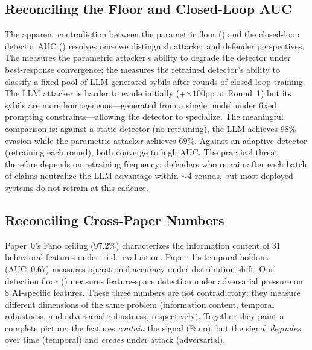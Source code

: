 \documentclass[sigconf,nonacm=false]{acmart}
\begin{document}
\subsection{Reconciling the \bestResponseAucFloorMean{} Floor and \closedLoopFinalAucMean{} Closed-Loop AUC}

The apparent contradiction between the parametric floor (\bestResponseAucFloorMean{}) and the closed-loop detector AUC (\closedLoopFinalAucMean{}) resolves once we distinguish attacker and defender perspectives. The \bestResponseAucFloorMean{} measures the parametric attacker's ability to degrade the detector under best-response convergence; the \closedLoopFinalAucMean{} measures the retrained detector's ability to classify a fixed pool of LLM-generated sybils after \bestResponseNRounds{} rounds of closed-loop training. The LLM attacker is harder to evade initially ($+$\closedLoopRoundEvasionDelta{}$\times 100$pp at Round~1) but its sybils are more homogeneous---generated from a single model under fixed prompting constraints---allowing the detector to specialize. The meaningful comparison is: against a static detector (no retraining), the LLM achieves 98\% evasion while the parametric attacker achieves 69\%. Against an adaptive detector (retraining each round), both converge to high AUC. The practical threat therefore depends on retraining frequency: defenders who retrain after each batch of claims neutralize the LLM advantage within ${\sim}$4 rounds, but most deployed systems do not retrain at this cadence.

\subsection{Reconciling Cross-Paper Numbers}

Paper~0's Fano ceiling (97.2\%) characterizes the information content of 31 behavioral features under i.i.d.\ evaluation. Paper~1's temporal holdout (AUC~0.67) measures operational accuracy under distribution shift. Our detection floor (\bestResponseAucFloorMean{}) measures feature-space detection under adversarial pressure on 8 AI-specific features. These three numbers are not contradictory: they measure different dimensions of the same problem (information content, temporal robustness, and adversarial robustness, respectively). Together they paint a complete picture: the features \emph{contain} the signal (Fano), but the signal \emph{degrades} over time (temporal) and \emph{erodes} under attack (adversarial).
\end{document}
